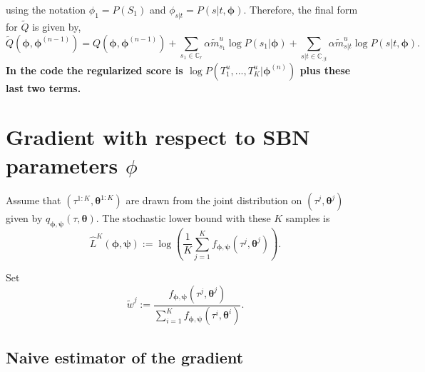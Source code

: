 \documentclass{article}
\newcommand{\bParam}{\bm{\theta}}
\begin{document}
using the notation $\phi_1 = P(S_1)$ and $\phi_{s|t} = P(s | t, \bm{\phi})$. Therefore, the final form for $\tilde{Q}$ is given by,
\begin{equation*}
    \tilde{Q}(\bm{\phi}, \bm{\phi}^{(n-1)}) = Q(\bm{\phi}, \bm{\phi}^{(n-1)}) + \sum\limits_{s_1 \in \mathbb{C}_r} \alpha \tilde{m}_{s_1}^u \log P(s_1 | \bm{\phi}) + \sum\limits_{s|t \in \mathbb{C}_{.|t}} \alpha \tilde{m}_{s|t}^u \log P(s | t, \bm{\phi}).
\end{equation*}
\textbf{In the code the regularized score is $\log P(T^u_1, ..., T^u_K | \bm{\phi}^{(n)})$ plus these last two terms.}

\section*{Gradient with respect to SBN parameters $\phi$}

Assume that $(\tau^{1:K}, \bm \theta^{1:K})$ are drawn from the joint distribution on $(\tau^j, \bm \theta^j)$ given by $q_{\bm{\phi},\bm{\psi}}(\tau, \bm{\theta})$.
The stochastic lower bound with these $K$ samples is
\[
    \hat{L}^K(\bm{\phi},{\bm{\psi}}) :=
    \log\left( \frac{1}{K} \sum_{j=1}^K f_{\bm{\phi},{\bm{\psi}}}(\tau^j, \bm \theta^j) \right).
\]

Set
\[
    \tilde{w}^j :=
    \frac{f_{\bm{\phi},{\bm{\psi}}}(\tau^j, \bm \theta^j)}
    {\sum_{i=1}^K f_{\bm{\phi},{\bm{\psi}}}(\tau^i, \bm \theta^i)}.
\]

\subsection*{Naive estimator of the gradient}

\end{document}
